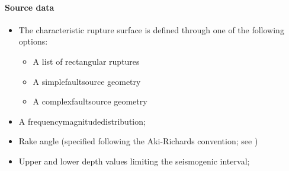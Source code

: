 %
\paragraph{Source data}
%
\begin{itemize}
\item The characteristic rupture surface is defined through one of the 
	following options:
	\begin{itemize}
		\item A list of rectangular ruptures 
		\item A \gls{simplefaultsource} geometry
		\item A \gls{complexfaultsource} geometry
	\end{itemize}
\item A \gls{frequencymagnitudedistribution};
\item Rake angle (specified following the Aki-Richards convention; 
see \citet{aki2002}) 
\item Upper and lower depth values limiting the seismogenic interval; 
\end{itemize}
